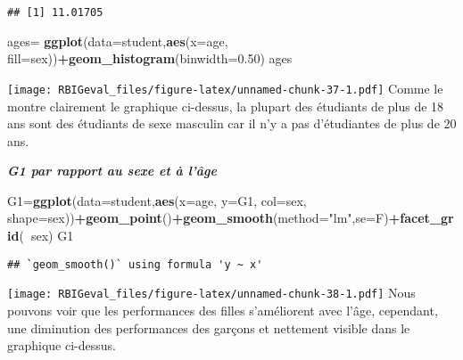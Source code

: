 \documentclass[
]{article}
\newenvironment{Shaded}{\begin{snugshade}}{\end{snugshade}}
\newcommand{\DataTypeTok}[1]{\textcolor[rgb]{0.13,0.29,0.53}{#1}}
\newcommand{\FloatTok}[1]{\textcolor[rgb]{0.00,0.00,0.81}{#1}}
\newcommand{\KeywordTok}[1]{\textcolor[rgb]{0.13,0.29,0.53}{\textbf{#1}}}
\newcommand{\NormalTok}[1]{#1}
\newcommand{\OperatorTok}[1]{\textcolor[rgb]{0.81,0.36,0.00}{\textbf{#1}}}
\newcommand{\StringTok}[1]{\textcolor[rgb]{0.31,0.60,0.02}{#1}}
\begin{document}
\begin{Shaded}
\end{Shaded}

\begin{verbatim}
## [1] 11.01705
\end{verbatim}

\begin{Shaded}
\begin{Highlighting}[]
\NormalTok{ages=}\StringTok{ }\KeywordTok{ggplot}\NormalTok{(}\DataTypeTok{data=}\NormalTok{student,}\KeywordTok{aes}\NormalTok{(}\DataTypeTok{x=}\NormalTok{age, }\DataTypeTok{fill=}\NormalTok{sex))}\OperatorTok{+}\KeywordTok{geom_histogram}\NormalTok{(}\DataTypeTok{binwidth=}\FloatTok{0.50}\NormalTok{)}
\NormalTok{ages}
\end{Highlighting}
\end{Shaded}

\texttt{[image: RBIGeval\_files/figure-latex/unnamed-chunk-37-1.pdf]}
Comme le montre clairement le graphique ci-dessus, la plupart des
étudiants de plus de 18 ans sont des étudiants de sexe masculin car il
n'y a pas d'étudiantes de plus de 20 ans.

\textbf{\emph{G1 par rapport au sexe et à l'âge}}

\begin{Shaded}
\begin{Highlighting}[]
\NormalTok{G1=}\KeywordTok{ggplot}\NormalTok{(}\DataTypeTok{data=}\NormalTok{student,}\KeywordTok{aes}\NormalTok{(}\DataTypeTok{x=}\NormalTok{age, }\DataTypeTok{y=}\NormalTok{G1, }\DataTypeTok{col=}\NormalTok{sex, }\DataTypeTok{shape=}\NormalTok{sex))}\OperatorTok{+}\KeywordTok{geom_point}\NormalTok{()}\OperatorTok{+}\KeywordTok{geom_smooth}\NormalTok{(}\DataTypeTok{method=}\StringTok{"lm"}\NormalTok{,}\DataTypeTok{se=}\NormalTok{F)}\OperatorTok{+}\KeywordTok{facet_grid}\NormalTok{(}\OperatorTok{~}\NormalTok{sex)}
\NormalTok{G1}
\end{Highlighting}
\end{Shaded}

\begin{verbatim}
## `geom_smooth()` using formula 'y ~ x'
\end{verbatim}

\texttt{[image: RBIGeval\_files/figure-latex/unnamed-chunk-38-1.pdf]}
Nous pouvons voir que les performances des filles s'améliorent avec
l'âge, cependant, une diminution des performances des garçons et
nettement visible dans le graphique ci-dessus.
\end{document}
